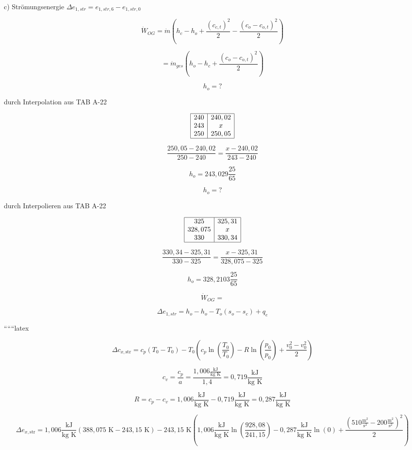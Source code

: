 c) Strömungsenergie $\Delta e_{1,str} = e_{1,str,6} - e_{1,str,0}$

\[
\dot{W}_{OG} = \dot{m} \left( h_c - h_o + \frac{(c_{c,t})^2}{2} - \frac{(c_o - c_{o,t})^2}{2} \right)
\]

\[
= \dot{m}_{ges} \left( h_o - h_c + \frac{(c_o - c_{o,t})^2}{2} \right)
\]

\[
h_o = ?
\]

durch Interpolation aus TAB A-22

\[
\begin{array}{|c|c|}
\hline
240 & 240,02 \\
243 & x \\
250 & 250,05 \\
\hline
\end{array}
\]

\[
\frac{250,05 - 240,02}{250 - 240} = \frac{x - 240,02}{243 - 240}
\]

\[
h_o = 243,029 \frac{25}{65}
\]

\[
h_o = ?
\]

durch Interpolieren aus TAB A-22

\[
\begin{array}{|c|c|}
\hline
325 & 325,31 \\
328,075 & x \\
330 & 330,34 \\
\hline
\end{array}
\]

\[
\frac{330,34 - 325,31}{330 - 325} = \frac{x - 325,31}{328,075 - 325}
\]

\[
h_o = 328,2103 \frac{25}{65}
\]

\[
\dot{W}_{OG} = 
\]

\[
\Delta e_{1,str} = h_o - h_o - T_o (s_o - s_c) + q_e
\]

``````latex


\[
\Delta c_{x,\text{str}} = c_p \left( T_0 - T_0 \right) - T_0 \left( c_p \ln \left( \frac{T_0}{T_0} \right) - R \ln \left( \frac{p_0}{p_0} \right) + \frac{v_0^2 - v_0^2}{2} \right)
\]

\[
c_v = \frac{c_p}{a} = \frac{1,006 \frac{\text{kJ}}{\text{kg K}}}{1,4} = 0,719 \frac{\text{kJ}}{\text{kg K}}
\]

\[
R = c_p - c_v = 1,006 \frac{\text{kJ}}{\text{kg K}} - 0,719 \frac{\text{kJ}}{\text{kg K}} = 0,287 \frac{\text{kJ}}{\text{kg K}}
\]

\[
\Delta e_{x,\text{str}} = 1,006 \frac{\text{kJ}}{\text{kg K}} \left( 388,075 \text{ K} - 243,15 \text{ K} \right) - 243,15 \text{ K} \left( 1,006 \frac{\text{kJ}}{\text{kg K}} \ln \left( \frac{928,08}{241,15} \right) - 0,287 \frac{\text{kJ}}{\text{kg K}} \ln (0) + \frac{(510 \frac{\text{m}^2}{\text{s}^2} - 200 \frac{\text{m}^2}{\text{s}^2})^2}{2} \right)
\]

